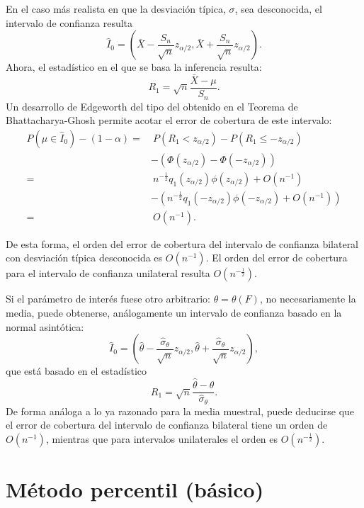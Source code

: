 \documentclass[
]{book}
\theoremstyle{break}
\theoremstyle{nonumberplain}
\begin{document}
En el caso más realista en que la desviación típica, \(\sigma\), sea
desconocida, el intervalo de confianza resulta
\[\hat{I}_{0}=\left( 
\bar{X}-\frac{S_n}{\sqrt{n}}z_{\alpha /2},\bar{X}+\frac{S_n}{
\sqrt{n}}z_{\alpha /2} \right).\]
Ahora, el estadístico en el que se basa la inferencia resulta:
\[R_1=\sqrt{n}\frac{\bar{X}-\mu }{S_n}.\]
Un desarrollo de Edgeworth del tipo del obtenido en el Teorema de Bhattacharya-Ghosh
permite acotar el error de cobertura de este intervalo:
\[\begin{aligned}
P\left( \mu \in \hat{I}_{0} \right) -\left( 1-\alpha \right) =&\ P\left(
R_1<z_{\alpha /2} \right) -P\left( R_1\leq -z_{\alpha /2} \right) \\
&-\left( \Phi \left( z_{\alpha /2} \right) -\Phi \left( -z_{\alpha
/2} \right) \right) \\
=&\ n^{-\frac{1}{2}}q_1\left( z_{\alpha /2} \right) \phi \left( z_{\alpha
/2} \right) +O\left( n^{-1} \right) \\
&-\left( n^{-\frac{1}{2}}q_1\left( -z_{\alpha /2} \right) \phi \left(
-z_{\alpha /2} \right) +O\left( n^{-1} \right) \right) \\
=&\ O\left( n^{-1} \right).
\end{aligned}\]

De esta forma, el orden del error de cobertura del intervalo de
confianza bilateral con desviación típica desconocida es \(O\left(
n^{-1} \right)\). El orden del error de cobertura para el intervalo de
confianza unilateral resulta \(O\left( n^{-\frac{1}{2}} \right)\).

Si el parámetro de interés fuese otro arbitrario: \(\theta =\theta
\left( F \right)\), no necesariamente la media, puede obtenerse,
análogamente un intervalo de confianza basado en la normal asintótica:
\[\hat{I}_{0}=\left( \hat{\theta}-\frac{\hat{\sigma}_{\theta }}{\sqrt{n}}
z_{\alpha /2},\hat{\theta}+\frac{\hat{\sigma}_{\theta }}{\sqrt{n}}
z_{\alpha/2} \right),\]
que está basado en el estadístico
\[R_1=\sqrt{n}\frac{\hat{\theta}-\theta }{\hat{\sigma}_{\theta }}.\]
De forma análoga a lo ya razonado para la media muestral, puede
deducirse que el error de cobertura del intervalo de confianza bilateral
tiene un orden de \(O\left( n^{-1} \right)\), mientras que para intervalos
unilaterales el orden es \(O\left( n^{-\frac{1}{2}} \right)\).

\section{Método percentil (básico)}\label{icboot-basic}
\end{document}
